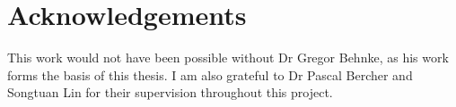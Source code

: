 \chapter*{Acknowledgements}

This work would not have been possible without Dr Gregor Behnke, as his work forms the basis of this thesis.
I am also grateful to Dr Pascal Bercher and Songtuan Lin for their supervision throughout this project.

